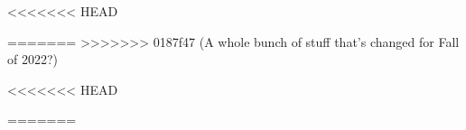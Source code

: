 \documentclass{../../oss-apphys-exam}
\begin{document}
\begin{multicols*}{2}
<<<<<<< HEAD

%  
%  
=======
>>>>>>> 0187f47 (A whole bunch of stuff that's changed for Fall of 2022?)
  \begin{questions}
%    
%
<<<<<<< HEAD
  
=======
    

\end{questions}
\end{multicols*}
\end{document}
